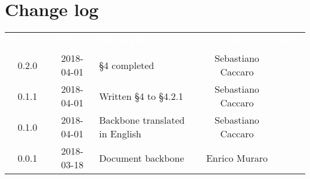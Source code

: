 \section*{Change log}
{
	\renewcommand{\arraystretch}{1.5}
	\centering
	\begin{longtable}{ c c C{6cm} c c }
		\textcolor{white}{\textbf{Version}} & \textcolor{white}{\textbf{Date}} & \textcolor{white}{\textbf{Description}} & \textcolor{white}{\textbf{Author}} & \textcolor{white}{\textbf{Role}}\\
		
		0.2.0 & 2018-04-01 & §4 completed  & Sebastiano Caccaro & \reda{}\\
		0.1.1 & 2018-04-01 & Written §4 to §4.2.1  & Sebastiano Caccaro & \reda{}\\
		0.1.0 & 2018-04-01 & Backbone translated in English & Sebastiano Caccaro & \reda{}\\
		0.0.1 & 2018-03-18 & Document backbone & Enrico Muraro & \reda{}\\
		
	\end{longtable}

}